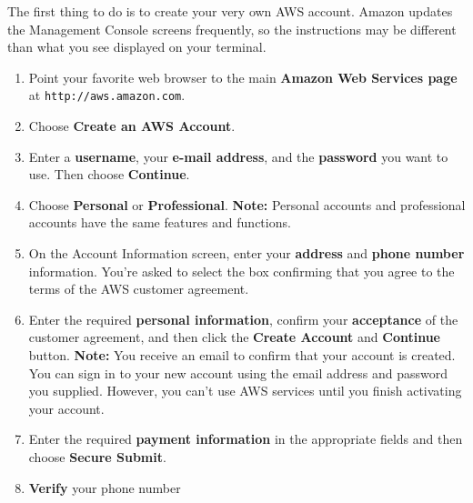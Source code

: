 \documentclass[]{book}
\providecommand{\tightlist}{%
  \setlength{\itemsep}{0pt}\setlength{\parskip}{0pt}}
\begin{document}
The first thing to do is to create your very own AWS account. Amazon updates the Management Console screens frequently, so the instructions may be different than what you see displayed on your terminal.

\begin{enumerate}
\def\labelenumi{\arabic{enumi}.}
\tightlist
\item
  Point your favorite web browser to the main \textbf{Amazon Web Services page} at \texttt{http://aws.amazon.com}.
\item
  Choose \textbf{Create an AWS Account}.
\item
  Enter a \textbf{username}, your \textbf{e-mail address}, and the \textbf{password} you want to use. Then choose \textbf{Continue}.
\item
  Choose \textbf{Personal} or \textbf{Professional}.
  \textbf{Note:} Personal accounts and professional accounts have the same features and functions.
\item
  On the Account Information screen, enter your \textbf{address} and \textbf{phone number} information. You're asked to select the box confirming that you agree to the terms of the AWS customer agreement.
\item
  Enter the required \textbf{personal information}, confirm your \textbf{acceptance} of the customer agreement, and then click the \textbf{Create Account} and \textbf{Continue} button.
  \textbf{Note:} You receive an email to confirm that your account is created. You can sign in to your new account using the email address and password you supplied. However, you can't use AWS services until you finish activating your account.
\item
  Enter the required \textbf{payment information} in the appropriate fields and then choose \textbf{Secure Submit}.
\item
  \textbf{Verify} your phone number


\end{enumerate}
\end{document}
